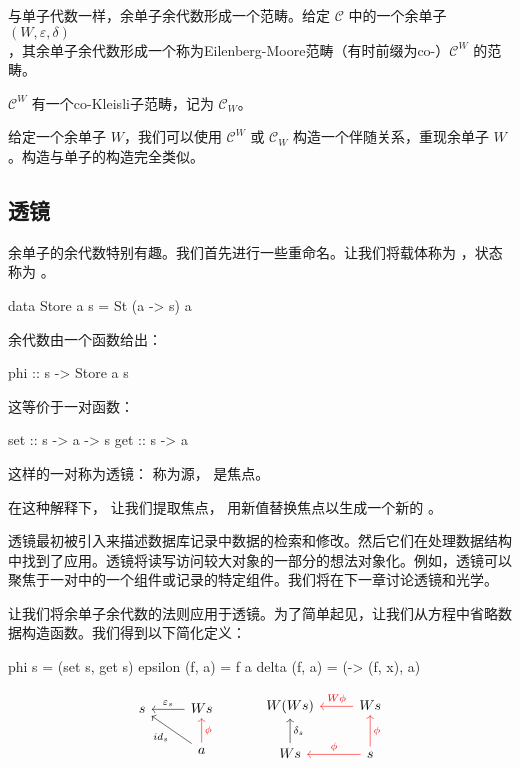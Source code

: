 \documentclass[DaoFP]{subfiles}
\begin{document}
与单子代数一样，余单子余代数形成一个范畴。给定 $\mathcal{C}$ 中的一个余单子 $(W, \varepsilon, \delta)$，其余单子余代数形成一个称为Eilenberg-Moore范畴（有时前缀为co-）$\mathcal{C}^W$ 的范畴。

$\mathcal{C}^W$ 有一个co-Kleisli子范畴，记为 $\mathcal{C}_W$。

给定一个余单子 $W$，我们可以使用 $\mathcal{C}^W$ 或 $\mathcal{C}_W$ 构造一个伴随关系，重现余单子 $W$。构造与单子的构造完全类似。

\subsection{透镜}

 余单子的余代数特别有趣。我们首先进行一些重命名。让我们将载体称为 ，状态称为 。
\begin{haskell}
data Store a s = St (a -> s) a
\end{haskell}
余代数由一个函数给出：
\begin{haskell}
phi :: s -> Store a s
\end{haskell}
这等价于一对函数：
\begin{haskell}
set :: s -> a -> s
get :: s -> a
\end{haskell}
这样的一对称为透镜： 称为源， 是焦点。

在这种解释下， 让我们提取焦点， 用新值替换焦点以生成一个新的 。

透镜最初被引入来描述数据库记录中数据的检索和修改。然后它们在处理数据结构中找到了应用。透镜将读写访问较大对象的一部分的想法对象化。例如，透镜可以聚焦于一对中的一个组件或记录的特定组件。我们将在下一章讨论透镜和光学。

让我们将余单子余代数的法则应用于透镜。为了简单起见，让我们从方程中省略数据构造函数。我们得到以下简化定义：
\begin{haskell}
phi s = (set s, get s)
epsilon (f, a) = f a
delta (f, a) = (\x -> (f, x), a)
\end{haskell}

\[
 \begin{tikzcd}
 s
 & W s
 \arrow[l, "\varepsilon_s"']
 \\
 & a
 \arrow[ul, "id_s"]
\arrow[u, red, "\phi"']
 \end{tikzcd}
  \hspace{30pt}
 \begin{tikzcd}
W(W s) 
&W s
\arrow[l, red, "W \phi "']
\\
W s
\arrow[u, "\delta_s"']
& s
\arrow[l, red, "\phi"']
\arrow[u, red, "\phi"']
 \end{tikzcd}
\]
\end{document}
